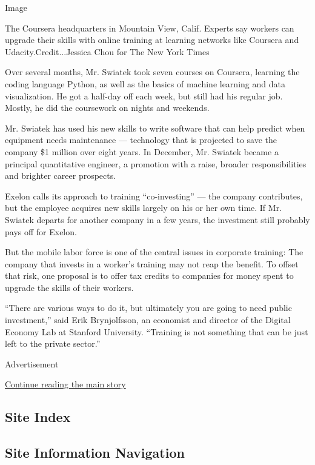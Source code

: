 Image

The Coursera headquarters in Mountain View, Calif. Experts say workers
can upgrade their skills with online training at learning networks like
Coursera and Udacity.Credit...Jessica Chou for The New York Times

Over several months, Mr. Swiatek took seven courses on Coursera,
learning the coding language Python, as well as the basics of machine
learning and data visualization. He got a half-day off each week, but
still had his regular job. Mostly, he did the coursework on nights and
weekends.

Mr. Swiatek has used his new skills to write software that can help
predict when equipment needs maintenance --- technology that is
projected to save the company \$1 million over eight years. In December,
Mr. Swiatek became a principal quantitative engineer, a promotion with a
raise, broader responsibilities and brighter career prospects.

Exelon calls its approach to training ``co-investing'' --- the company
contributes, but the employee acquires new skills largely on his or her
own time. If Mr. Swiatek departs for another company in a few years, the
investment still probably pays off for Exelon.

But the mobile labor force is one of the central issues in corporate
training: The company that invests in a worker's training may not reap
the benefit. To offset that risk, one proposal is to offer tax credits
to companies for money spent to upgrade the skills of their workers.

``There are various ways to do it, but ultimately you are going to need
public investment,'' said Erik Brynjolfsson, an economist and director
of the Digital Economy Lab at Stanford University. ``Training is not
something that can be just left to the private sector.''

Advertisement

\protect\hyperlink{after-bottom}{Continue reading the main story}

\hypertarget{site-index}{%
\subsection{Site Index}\label{site-index}}

\hypertarget{site-information-navigation}{%
\subsection{Site Information
Navigation}\label{site-information-navigation}}

